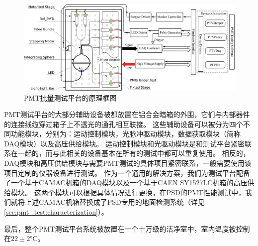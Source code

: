 \begin{figure}[htb]
	\centering
	\includegraphics[width=\textwidth]{chap/pmt_test/fig/testbench_schematic.eps}
	\caption{PMT批量测试平台的原理框图}
	\label{fig:pmt_test:testbench_schematic}
\end{figure}

PMT测试平台的大部分辅助设备被都放置在铝合金暗箱的外围，它们与内部器件的连接线缆穿过箱子上不透光的通孔相互联接。
这些辅助设备可以被分为四个不同功能模块，分别为：运动控制模块，光脉冲驱动模块，数据获取模块（简称DAQ模块）以及高压供给模块。
运动控制模块和光驱动模块是和测试平台紧密联系在一起的，而与此相关的设备基本在所有的测试中都可以重复使用。
相反的，DAQ模块和高压供给模块与需要PMT测试的具体项目紧密联系，一般需要使用该项目定制的仪器设备进行测试。
作为一个通用的解决方案，我们为测试平台配备了一个基于CAMAC机箱的DAQ模块以及一个基于CAEN SY1527LC机箱\parencite{sy1527lc}的高压供给模块。
这两个模块可以根据具体情况进行更换，在PSD的PMT性能测试中，我们就将上述CAMAC机箱替换成了PSD专用的地面检测系统（详见\ref{sec:pmt_test:characterization}）。

最后，整个PMT测试平台系统被放置在一个十万级的洁净室中，室内温度被控制在$22\pm2$\si{\celsius}。

